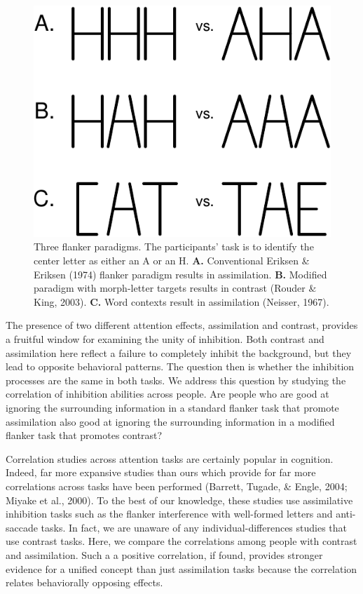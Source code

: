 \documentclass[english,floatsintext,man]{apa6}
\theoremstyle{definition}
\theoremstyle{definition}
\theoremstyle{definition}
\theoremstyle{remark}
\begin{document}
\begin{figure}[htbp]
\centering
\includegraphics{paper_files/figure-latex/past-1.pdf}
\caption{\label{fig:past}Three flanker paradigms. The participants' task is
to identify the center letter as either an A or an H. \textbf{A.}
Conventional Eriksen \& Eriksen (1974) flanker paradigm results in
assimilation. \textbf{B.} Modified paradigm with morph-letter targets
results in contrast (Rouder \& King, 2003). \textbf{C.} Word contexts
result in assimilation (Neisser, 1967).}
\end{figure}

The presence of two different attention effects, assimilation and
contrast, provides a fruitful window for examining the unity of
inhibition. Both contrast and assimilation here reflect a failure to
completely inhibit the background, but they lead to opposite behavioral
patterns. The question then is whether the inhibition processes are the
same in both tasks. We address this question by studying the correlation
of inhibition abilities across people. Are people who are good at
ignoring the surrounding information in a standard flanker task that
promote assimilation also good at ignoring the surrounding information
in a modified flanker task that promotes contrast?

Correlation studies across attention tasks are certainly popular in
cognition. Indeed, far more expansive studies than ours which provide
for far more correlations across tasks have been performed (Barrett,
Tugade, \& Engle, 2004; Miyake et al., 2000). To the best of our
knowledge, these studies use assimilative inhibition tasks such as the
flanker interference with well-formed letters and anti-saccade tasks. In
fact, we are unaware of any individual-differences studies that use
contrast tasks. Here, we compare the correlations among people with
contrast and assimilation. Such a a positive correlation, if found,
provides stronger evidence for a unified concept than just assimilation
tasks because the correlation relates behaviorally opposing effects.
\end{document}
